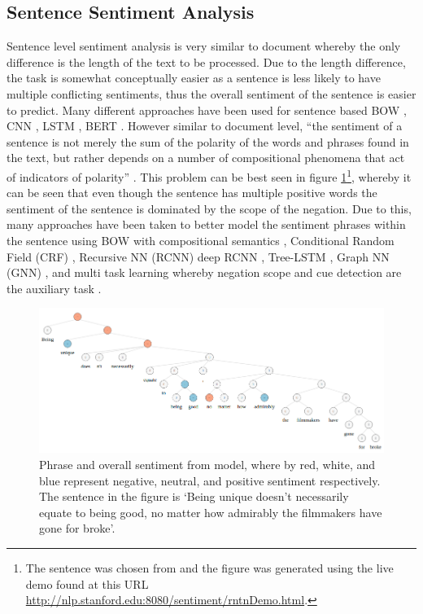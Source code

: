 \subsection{Sentence Sentiment Analysis}
Sentence level sentiment analysis is very similar to document whereby the only difference is the length of the text to be processed. Due to the length difference, the task is somewhat conceptually easier as a sentence is less likely to have multiple conflicting sentiments, thus the overall sentiment of the sentence is easier to predict. Many different approaches have been used for sentence based BOW \citep{wang-manning-2012-baselines}, CNN \citep{kim-2014-convolutional, kalchbrenner-etal-2014-convolutional}, LSTM \citep{brahma2018improved}, BERT \citep{devlin-etal-2019-bert}. However similar to document level, ``the sentiment of a sentence is not merely the sum of the polarity of the words and phrases found in the text, but rather depends on a number of compositional phenomena that act of indicators of polarity'' \citep{barnes2019improving}. This problem can be best seen in figure \ref{fig:lit_review_sentence_sentiment_example}\footnote{The sentence was chosen from \citet{barnes2019improving} and the figure was generated using the live demo found at this URL \url{http://nlp.stanford.edu:8080/sentiment/rntnDemo.html}.}, whereby it can be seen that even though the sentence has multiple positive words the sentiment of the sentence is dominated by the scope of the negation. Due to this, many approaches have been taken to better model the sentiment phrases within the sentence using BOW with compositional semantics \citep{choi-cardie-2008-learning}, Conditional Random Field (CRF) \citep{nakagawa-etal-2010-dependency}, Recursive NN (RCNN) \citep{socher-etal-2012-semantic} deep RCNN \citep{irsoy2014deep}, Tree-LSTM \citep{tai-etal-2015-improved}, Graph NN (GNN) \citep{zhang-zhang-2019-tree}, and multi task learning whereby negation scope and cue detection are the auxiliary task \citep{barnes2019improving}.

\begin{figure}[!h]
    \centering
    \includegraphics[scale=0.4]{images/lit_review/sentence_sentiment_example.png}
    \caption{Phrase and overall sentiment from \citet{socher-etal-2013-recursive} model, where by red, white, and blue represent negative, neutral, and positive sentiment respectively. The sentence in the figure is `Being unique doesn’t necessarily equate to being good, no matter how admirably the filmmakers have gone for broke'.}
    \label{fig:lit_review_sentence_sentiment_example}
\end{figure}

